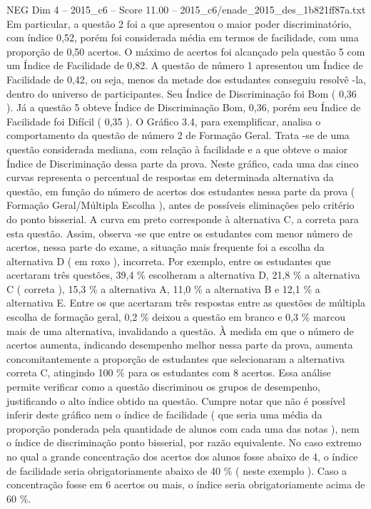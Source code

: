 \begin{textsample}{NEG Dim 4 – 2015\_c6 – Score 11.00 – 2015\_c6/enade\_2015\_des\_1b821ff87a.txt}
Em particular, a questão 2 foi a que apresentou o maior poder discriminatório, com índice 0,52, porém foi considerada média em termos de facilidade, com uma proporção de 0,50 acertos.
O máximo de acertos foi alcançado pela questão 5 com um Índice de Facilidade de 0,82.
A questão de número 1 apresentou um Índice de Facilidade de 0,42, ou seja, menos da metade dos estudantes conseguiu resolvê -la, dentro do universo de participantes.
Seu Índice de Discriminação foi Bom ( 0,36 ).
Já a questão 5 obteve Índice de Discriminação Bom, 0,36, porém seu Índice de Facilidade foi Difícil ( 0,35 ).
O Gráfico 3.4, para exemplificar, analisa o comportamento da questão de número 2 de Formação Geral.
Trata -se de uma questão considerada mediana, com relação à facilidade e a que obteve o maior Índice de Discriminação dessa parte da prova.
Neste gráfico, cada uma das cinco curvas representa o percentual de respostas em determinada alternativa da questão, em função do número de acertos dos estudantes nessa parte da prova ( Formação Geral/Múltipla Escolha ), antes de possíveis eliminações pelo critério do ponto bisserial.
A curva em preto corresponde à alternativa C, a correta para esta questão.
Assim, observa -se que entre os estudantes com menor número de acertos, nessa parte do exame, a situação mais frequente foi a escolha da alternativa D ( em roxo ), incorreta.
Por exemplo, entre os estudantes que acertaram três questões, 39,4 \% escolheram a alternativa D, 21,8 \% a alternativa C ( correta ), 15,3 \% a alternativa A, 11,0 \% a alternativa B e 12,1 \% a alternativa E.
Entre os que acertaram três respostas entre as questões de múltipla escolha de formação geral, 0,2 \% deixou a questão em branco e 0,3 \% marcou mais de uma alternativa, invalidando a questão.
À medida em que o número de acertos aumenta, indicando desempenho melhor nessa parte da prova, aumenta concomitantemente a proporção de estudantes que selecionaram a alternativa correta C, atingindo 100 \% para os estudantes com 8 acertos.
Essa análise permite verificar como a questão discriminou os grupos de desempenho, justificando o alto índice obtido na questão.
Cumpre notar que não é possível inferir deste gráfico nem o índice de facilidade ( que seria uma média da proporção ponderada pela quantidade de alunos com cada uma das notas ), nem o índice de discriminação ponto bisserial, por razão equivalente.
No caso extremo no qual a grande concentração dos acertos dos alunos fosse abaixo de 4, o índice de facilidade seria obrigatoriamente abaixo de 40 \% ( neste exemplo ).
Caso a concentração fosse em 6 acertos ou mais, o índice seria obrigatoriamente acima de 60 \%.

\end{textsample}
